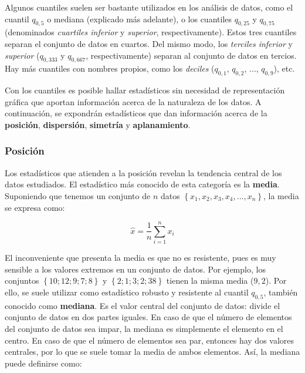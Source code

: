 \documentclass[12pt]{article}
\begin{document}
Algunos cuantiles suelen ser bastante utilizados en los análisis de datos, como el cuantil $q_{0,5}$ o mediana (explicado más adelante), o los cuantiles $q_{0,25}$ y $q_{0,75}$ (denominados \textit{cuartiles inferior} y \textit{superior}, respectivamente). Estos tres cuantiles separan el conjunto de datos en cuartos. Del mismo modo, los \textit{terciles inferior} y \textit{superior} ($q_{0,333}$ y $q_{0,667}$, respectivamente) separan al conjunto de datos en tercios. Hay más cuantiles con nombres propios, como los \textit{deciles} ($q_{0,1}$, $q_{0,2}$, ..., $q_{0,9}$), etc.

Con los cuantiles es posible hallar estadísticos sin necesidad de representación gráfica que aportan información acerca de la naturaleza de los datos. A continuación, se expondrán estadísticos que dan información acerca de la \textbf{posición}, \textbf{dispersión}, \textbf{simetría} y \textbf{aplanamiento}.

\subsubsection{Posición}

Los estadísticos que atienden a la posición revelan la tendencia central de los datos estudiados. El estadístico más conocido de esta categoría es la \textbf{media}. Suponiendo que tenemos un conjunto de $n$ datos $\left\lbrace x_{1}, x_{2}, x_{3}, x_{4}, ..., x_{n} \right\rbrace$, la media se expresa como:

\begin{equation}
\hat{x} = \frac{1}{n} \sum^{n}_{i = 1} x_{i}
\label{eq:mean}
\end{equation}

El inconveniente que presenta la media es que no es resistente, pues es muy sensible a los valores extremos en un conjunto de datos. Por ejemplo, los conjuntos $\left\lbrace 10; 12; 9; 7; 8 \right\rbrace$ y $\left\lbrace 2; 1; 3; 2; 38 \right\rbrace$ tienen la misma media ($9,2$). Por ello, se suele utilizar como estadístico robusto y resistente al cuantil $q_{0,5}$, también conocido como \textbf{mediana}. Es el valor central del conjunto de datos: divide el conjunto de datos en dos partes iguales. En caso de que el número de elementos del conjunto de datos sea impar, la mediana es simplemente el elemento en el centro. En caso de que el número de elementos sea par, entonces hay dos valores centrales, por lo que se suele tomar la media de ambos elementos. Así, la mediana puede definirse como:
\end{document}

